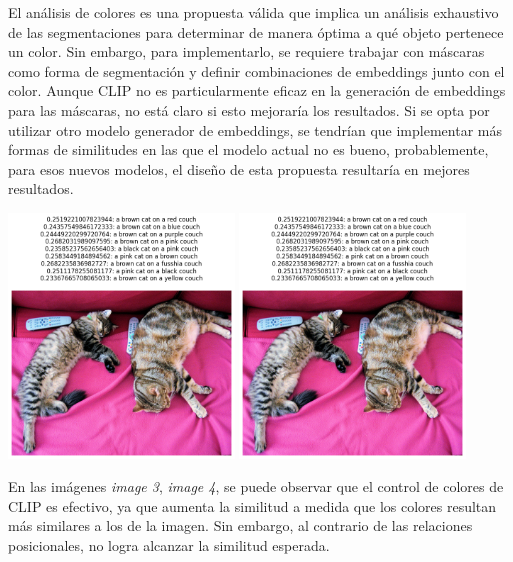 El análisis de colores es una propuesta válida que implica un análisis exhaustivo de las segmentaciones para determinar de manera óptima a qué objeto pertenece un color. Sin embargo, para implementarlo, se requiere trabajar con máscaras como forma de segmentación y definir combinaciones de embeddings junto con el color. Aunque CLIP no es particularmente eficaz en la generación de embeddings para las máscaras, no está claro si esto mejoraría los resultados. Si se opta por utilizar otro modelo generador de embeddings, se tendrían que implementar más formas de similitudes en las que el modelo actual no es bueno, probablemente, para esos nuevos modelos, el dise\~no de esta propuesta resultaría en mejores resultados.

\begin{adjustbox}{valign=c, center}
\includegraphics[height=65mm]{Graphics/clip_color.png}
\includegraphics[height=65mm]{Graphics/clip_color.png}
\end{adjustbox}

En las imágenes \textit{image 3}, \textit{image 4}, se puede observar que el control de colores de CLIP es efectivo, ya que aumenta la similitud a medida que los colores resultan más similares a los de la imagen. Sin embargo, al contrario de las relaciones posicionales, no logra alcanzar la similitud esperada.

